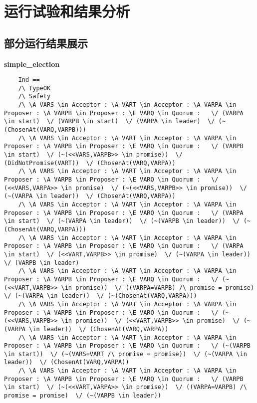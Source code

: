 \chapter{运行试验和结果分析}

\section{部分运行结果展示}
\textbf{simple\_election}
\begin{lstlisting}
    Ind == 
    /\ TypeOK
    /\ Safety
    /\ \A VARS \in Acceptor : \A VART \in Acceptor : \A VARPA \in Proposer : \A VARPB \in Proposer : \E VARQ \in Quorum :   \/ (VARPA \in start)  \/ (VARPB \in start)  \/ (VARPA \in leader)  \/ (~(ChosenAt(VARQ,VARPB)))
    /\ \A VARS \in Acceptor : \A VART \in Acceptor : \A VARPA \in Proposer : \A VARPB \in Proposer : \E VARQ \in Quorum :   \/ (VARPB \in start)  \/ (~(<<VARS,VARPB>> \in promise))  \/ (DidNotPromise(VART))  \/ (ChosenAt(VARQ,VARPA))
    /\ \A VARS \in Acceptor : \A VART \in Acceptor : \A VARPA \in Proposer : \A VARPB \in Proposer : \E VARQ \in Quorum :   \/ (<<VARS,VARPA>> \in promise)  \/ (~(<<VARS,VARPB>> \in promise))  \/ (~(VARPA \in leader))  \/ (ChosenAt(VARQ,VARPA))
    /\ \A VARS \in Acceptor : \A VART \in Acceptor : \A VARPA \in Proposer : \A VARPB \in Proposer : \E VARQ \in Quorum :   \/ (VARPA \in start)  \/ (~(VARPA \in leader))  \/ (~(VARPB \in leader))  \/ (~(ChosenAt(VARQ,VARPA)))
    /\ \A VARS \in Acceptor : \A VART \in Acceptor : \A VARPA \in Proposer : \A VARPB \in Proposer : \E VARQ \in Quorum :   \/ (VARPA \in start)  \/ (<<VART,VARPB>> \in promise)  \/ (~(VARPA \in leader))  \/ (VARPB \in leader)
    /\ \A VARS \in Acceptor : \A VART \in Acceptor : \A VARPA \in Proposer : \A VARPB \in Proposer : \E VARQ \in Quorum :   \/ (~(<<VART,VARPB>> \in promise))  \/ ((VARPA=VARPB) /\ promise = promise)  \/ (~(VARPA \in leader))  \/ (~(ChosenAt(VARQ,VARPA)))
    /\ \A VARS \in Acceptor : \A VART \in Acceptor : \A VARPA \in Proposer : \A VARPB \in Proposer : \E VARQ \in Quorum :   \/ (~(<<VARS,VARPB>> \in promise))  \/ (<<VART,VARPB>> \in promise)  \/ (~(VARPA \in leader))  \/ (ChosenAt(VARQ,VARPA))
    /\ \A VARS \in Acceptor : \A VART \in Acceptor : \A VARPA \in Proposer : \A VARPB \in Proposer : \E VARQ \in Quorum :   \/ (~(VARPB \in start))  \/ (~(VARS=VART /\ promise = promise))  \/ (~(VARPA \in leader))  \/ (ChosenAt(VARQ,VARPA))
    /\ \A VARS \in Acceptor : \A VART \in Acceptor : \A VARPA \in Proposer : \A VARPB \in Proposer : \E VARQ \in Quorum :   \/ (VARPB \in start)  \/ (~(<<VART,VARPA>> \in promise))  \/ ((VARPA=VARPB) /\ promise = promise)  \/ (~(VARPB \in leader))

\end{lstlisting}
